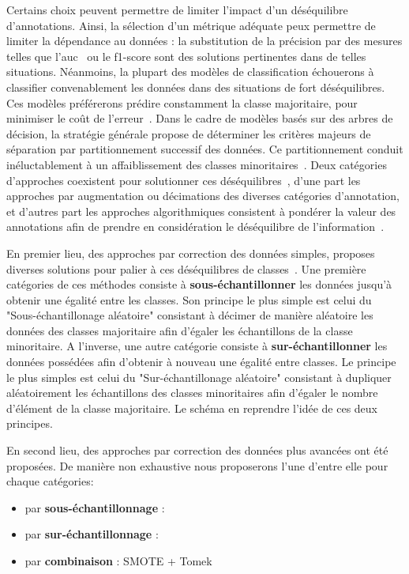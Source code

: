 Certains choix peuvent permettre de limiter l'impact d'un déséquilibre d'annotations. Ainsi, la sélection d'un métrique adéquate peux permettre de limiter la dépendance au données : la substitution de la précision par des mesures telles que l'\gls{auc}~\cite{Celebi2007} ou le f1-score sont des solutions pertinentes dans de telles situations. Néanmoins, la plupart des modèles de classification échouerons à classifier convenablement les données dans des situations de fort déséquilibres. Ces modèles préférerons prédire constamment la classe majoritaire, pour minimiser le coût de l'erreur~\cite{Huang2013}. Dans le cadre de modèles basés sur des arbres de décision, la stratégie générale propose de déterminer les critères majeurs de séparation par partitionnement successif des données. Ce partitionnement conduit inéluctablement à un affaiblissement des classes minoritaires~\cite{He2009}. Deux catégories d'approches coexistent pour solutionner ces déséquilibres~\cite{Huang2013}, d'une part les approches   par augmentation ou décimations des diverses catégories d'annotation, et d'autres part les approches algorithmiques consistent à pondérer la valeur des annotations afin de prendre en considération le déséquilibre de l'information~\cite{Ting2002,He2009,Thai2010}.\par

En premier lieu, des approches par correction des données simples, proposes diverses solutions pour palier à ces déséquilibres de classes~\cite{Prati2009, He2009}. Une première catégories de ces méthodes consiste à \textbf{sous-échantillonner} les données jusqu'à obtenir une égalité entre les classes. Son principe le plus simple est celui du "Sous-échantillonage aléatoire" consistant à décimer de manière aléatoire les données des classes majoritaire afin d'égaler les échantillons de la classe minoritaire. A l'inverse, une autre catégorie consiste à \textbf{sur-échantillonner} les données possédées afin d'obtenir à nouveau une égalité entre classes. Le principe le plus simples est celui du "Sur-échantillonage aléatoire" consistant à dupliquer aléatoirement les échantillons des classes minoritaires afin d'égaler le nombre d'élément de la classe majoritaire. Le schéma en  reprendre l'idée de ces deux principes.\par

En second lieu, des approches par correction des données plus avancées ont été proposées. De manière non exhaustive nous proposerons l'une d'entre elle pour chaque catégories:
\begin{itemize}
    \item par \textbf{sous-échantillonnage} : \cite{Tomek1976}
    \item par \textbf{sur-échantillonnage} :\cite{Chawla2002} 
    \item par \textbf{combinaison} : SMOTE + Tomek
\end{itemize}\par

